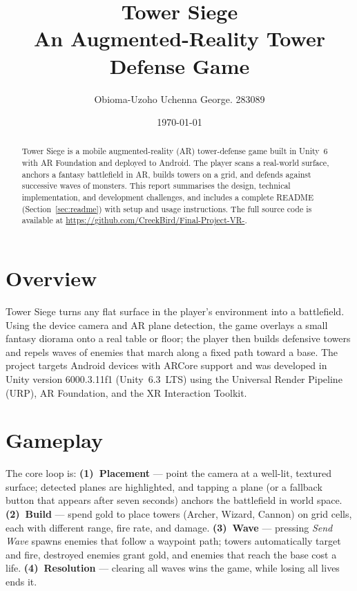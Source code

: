 \documentclass[11pt,a4paper]{article}
\title{\textbf{Tower Siege}\\[0.4em]\large An Augmented-Reality Tower Defense Game}
\author{Obioma-Uzoho Uchenna George. 283089}
\date{\today}
\begin{document}
\maketitle

\begin{abstract}
\noindent Tower Siege is a mobile augmented-reality (AR) tower-defense game built in Unity~6 with AR Foundation and deployed to Android. The player scans a real-world surface, anchors a fantasy battlefield in AR, builds towers on a grid, and defends against successive waves of monsters. This report summarises the design, technical implementation, and development challenges, and includes a complete README (Section~\ref{sec:readme}) with setup and usage instructions. The full source code is available at \url{https://github.com/CreekBird/Final-Project-VR-}.
\end{abstract}

\section{Overview}
Tower Siege turns any flat surface in the player's environment into a battlefield. Using the device camera and AR plane detection, the game overlays a small fantasy diorama onto a real table or floor; the player then builds defensive towers and repels waves of enemies that march along a fixed path toward a base. The project targets Android devices with ARCore support and was developed in Unity version 6000.3.11f1 (Unity~6.3~LTS) using the Universal Render Pipeline (URP), AR Foundation, and the XR Interaction Toolkit.

\section{Gameplay}
The core loop is: \textbf{(1)~Placement} --- point the camera at a well-lit, textured surface; detected planes are highlighted, and tapping a plane (or a fallback button that appears after seven seconds) anchors the battlefield in world space. \textbf{(2)~Build} --- spend gold to place towers (Archer, Wizard, Cannon) on grid cells, each with different range, fire rate, and damage. \textbf{(3)~Wave} --- pressing \emph{Send Wave} spawns enemies that follow a waypoint path; towers automatically target and fire, destroyed enemies grant gold, and enemies that reach the base cost a life. \textbf{(4)~Resolution} --- clearing all waves wins the game, while losing all lives ends it.
\end{document}
